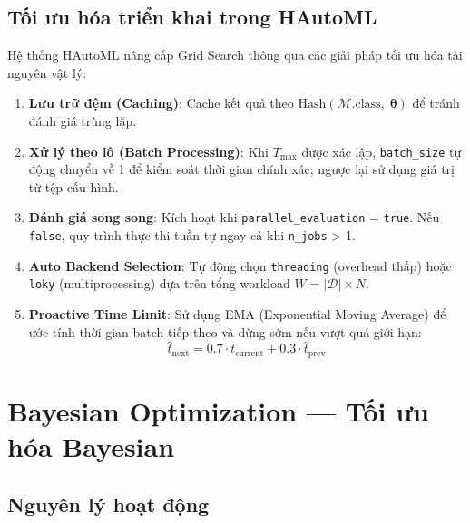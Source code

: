 \documentclass[12pt,a4paper]{article}
\begin{document}
\subsection{Tối ưu hóa triển khai trong HAutoML}

Hệ thống HAutoML nâng cấp Grid Search thông qua các giải pháp tối ưu hóa
tài nguyên vật lý:

\begin{enumerate}
    \item \textbf{Lưu trữ đệm (Caching)}: Cache kết quả theo
    $\text{Hash}(\mathcal{M}.\text{class},\; \boldsymbol{\theta})$ để tránh
    đánh giá trùng lặp.

    \item \textbf{Xử lý theo lô (Batch Processing)}: Khi $T_{\max}$ được xác
    lập, \texttt{batch\_size} tự động chuyển về 1 để kiểm soát thời gian chính
    xác; ngược lại sử dụng giá trị từ tệp cấu hình.

    \item \textbf{Đánh giá song song}: Kích hoạt khi
    \texttt{parallel\_evaluation} = \texttt{true}. Nếu \texttt{false}, quy trình
    thực thi tuần tự ngay cả khi \texttt{n\_jobs} > 1.

    \item \textbf{Auto Backend Selection}: Tự động chọn \texttt{threading}
    (overhead thấp) hoặc \texttt{loky} (multiprocessing) dựa trên tổng workload
    $W = |\mathcal{D}| \times N$.

    \item \textbf{Proactive Time Limit}: Sử dụng EMA (Exponential Moving Average)
    để ước tính thời gian batch tiếp theo và dừng sớm nếu vượt quá giới hạn:
    \begin{equation}
        \hat{t}_{\text{next}} = 0.7 \cdot t_{\text{current}} + 0.3 \cdot \hat{t}_{\text{prev}}
        \label{eq:ema_time}
    \end{equation}
\end{enumerate}



\section{Bayesian Optimization --- Tối ưu hóa Bayesian}
\label{sec:bayesian}

\subsection{Nguyên lý hoạt động}
\end{document}
